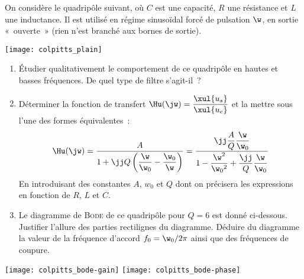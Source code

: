 \documentclass[a4paper, 12pt, final, garamond]{book}
\begin{document}
\begin{minipage}{.50\linewidth}
	On considère le quadripôle suivant, où $C$ est une capacité, $R$ une
	résistance et $L$ une inductance. Il est utilisé en régime sinusoïdal forcé
	de pulsation $\w$, en sortie «~ouverte~» (rien n'est branché aux bornes de
	sortie).
\end{minipage}
\begin{minipage}{0.50\linewidth}
	\begin{center}
		\texttt{[image: colpitts\_plain]}
	\end{center}
\end{minipage}
\begin{enumerate}
	\item Étudier qualitativement le comportement de ce quadripôle en hautes et
	      basses fréquences. De quel type de filtre s'agit-il~?
	\item Déterminer la fonction de transfert $\Hu(\jw) =
		      \dfrac{\xul{u_s}}{\xul{u_e}}$ et la mettre sous l'une des formes
	      équivalentes~:
	      \[\Hu(\jw) = \frac{A}{1+\jj Q \left( \dfrac{\w}{\w_0} -
			      \dfrac{\w_0}{\w} \right)} = \frac{\jj\dfrac{A}{Q}\dfrac{\w}{\w_0}}{1
			      - \dfrac{\w^2}{\w_0{}^2} + \dfrac{\jj}{Q} \dfrac{\w}{\w_0}}\]
	      En introduisant des constantes $A$, $w_0$ et $Q$ dont on précisera les
	      expressions en fonction de $R$, $L$ et $C$.
	\item Le diagramme de \textsc{Bode} de ce quadripôle pour $Q = 6$ est donné
	      ci-dessous. Justifier l'allure des parties rectilignes du diagramme.
	      Déduire du diagramme la valeur de la fréquence d'accord $f_0 =
		      \w_0/2\pi$ ainsi que des fréquences de coupure.
\end{enumerate}
\begin{center}
	\texttt{[image: colpitts\_bode-gain]}
	\texttt{[image: colpitts\_bode-phase]}
\end{center}
\end{document}
